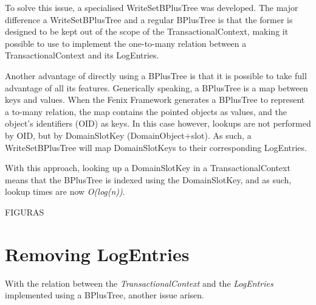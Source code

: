 \begin{figure}
  \centering

\caption{}
\label{fig:linkedList}
\end{figure}

To solve this issue, a specialised WriteSetBPlusTree was
developed. The major difference a WriteSetBPlusTree and a regular
BPlusTree is that the former is designed to be kept out of the scope
of the TransactionalContext, making it possible to use to implement
the one-to-many relation between a TransactionalContext and its
LogEntries.

Another advantage of directly using a BPlusTree is that it is possible
to take full advantage of all its features. Generically speaking, a
BPlusTree is a map between keys and values. When the Fenix Framework
generates a BPlusTree to represent a to-many relation, the map
contains the pointed objects as values, and the object's identifiers
(OID) as keys. In this case however, lookups are not performed by OID,
but by DomainSlotKey (DomainObject+slot). As such, a WriteSetBPlusTree
will map DomainSlotKeys to their corresponding LogEntries.

With this approach, looking up a DomainSlotKey in a
TransactionalContext means that the BPlusTree is indexed using the
DomainSlotKey, and as such, lookup times are now {\it O(log(n))}.

FIGURAS

\section{Removing LogEntries}

With the relation between the {\it TransactionalContext} and the {\it
  LogEntries} implemented using a BPlusTree, another issue arisen. 

